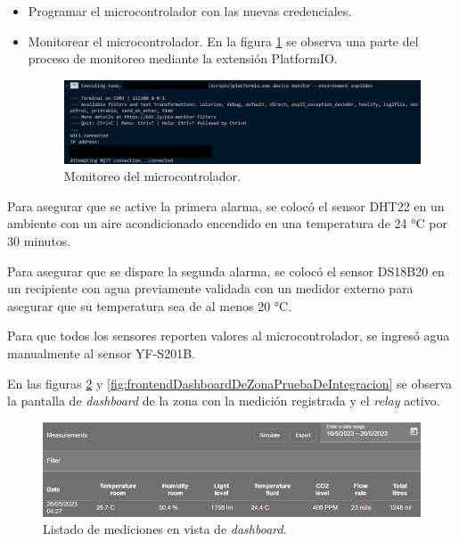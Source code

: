 \begin{itemize}
	\item Programar el microcontrolador con las nuevas credenciales.

	\item Monitorear el microcontrolador. En la figura \ref{fig:microcontroladorMonitoreo} se observa una parte del proceso de monitoreo mediante la extensión PlatformIO.
	
\begin{figure}[H]
	\centering
	\includegraphics[width=1.00\textwidth, height=0.45\linewidth]{./Figures/Microcontrolador monitoreo.png}
	\caption{Monitoreo del microcontrolador.}
	\label{fig:microcontroladorMonitoreo}
\end{figure}
\end{itemize}

Para asegurar que se active la primera alarma, se colocó el sensor DHT22 en un ambiente con un aire acondicionado \citep{WEBSITE:BGHR410A} encendido en una temperatura de 24 °C por 30 minutos. 

Para asegurar que se dispare la segunda alarma, se colocó el sensor DS18B20 en un recipiente con agua previamente validada con un medidor externo \citep{WEBSITE:TP101} para asegurar que su temperatura sea de al menos 20 °C. 

Para que todos los sensores reporten valores al microcontrolador, se ingresó agua manualmente al sensor YF-S201B.

En las figuras \ref{fig:frontendListadoMedicionesPruebaDeIntegracion} y \ref{fig:frontendDashboardDeZonaPruebaDeIntegracion} se observa la pantalla de \textit{dashboard} de la zona con la medición registrada y el \textit{relay} activo. 

\begin{figure}[H]
	\centering
	\includegraphics[width=.9\textwidth]{./Figures/Frontend listado de mediciones prueba de integracion.png}
	\caption{Listado de mediciones en vista de \textit{dashboard}.}
	\label{fig:frontendListadoMedicionesPruebaDeIntegracion}
\end{figure}


